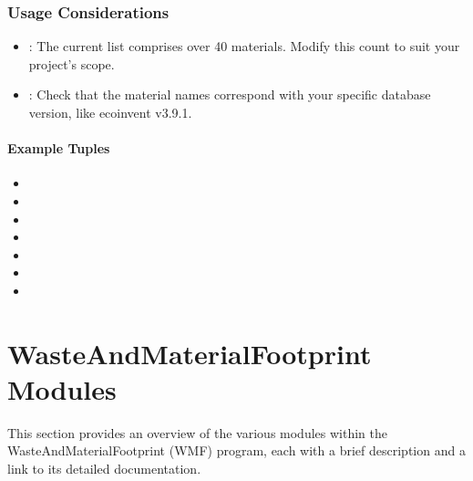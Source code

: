 \documentclass[letterpaper,10pt,english]{sphinxmanual}
\begin{document}
\subsection{Usage Considerations}
\label{\detokenize{configuration:usage-considerations}}\begin{itemize}
\item {} 
\sphinxAtStartPar
{}: The current list comprises over 40 materials. Modify this count to suit your project’s scope.

\item {} 
\sphinxAtStartPar
{}: Check that the material names correspond with your specific database version, like ecoinvent v3.9.1.

\end{itemize}


\subsubsection{Example Tuples}
\label{\detokenize{configuration:example-tuples}}\begin{itemize}
\item {} 
\sphinxAtStartPar
{}

\item {} 
\sphinxAtStartPar
{}

\item {} 
\sphinxAtStartPar
{}

\item {} 
\sphinxAtStartPar
{}

\item {} 
\sphinxAtStartPar
{}

\item {} 
\sphinxAtStartPar
{}

\item {} 
\sphinxAtStartPar
{}

\end{itemize}

\sphinxstepscope


\chapter{WasteAndMaterialFootprint Modules}
\label{\detokenize{modules:wasteandmaterialfootprint-modules}}\label{\detokenize{modules::doc}}
\sphinxAtStartPar
This section provides an overview of the various modules within the WasteAndMaterialFootprint (WMF) program, each with a brief description and a link to its detailed documentation.
\end{document}

